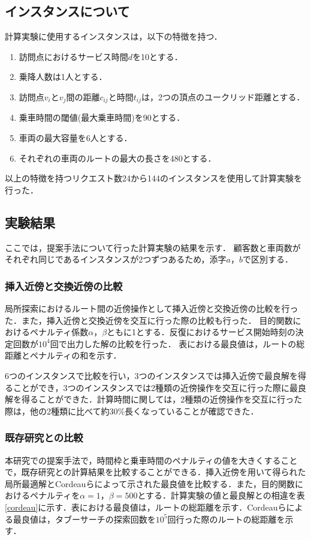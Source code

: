 \documentclass[a4j，11pt，twocolumn]{jsarticle}
\begin{document}
\subsection{インスタンスについて}
計算実験に使用するインスタンスは，以下の特徴を持つ．
\begin{enumerate}
 \item 訪問点におけるサービス時間$d$を10とする．
 \item 乗降人数は1人とする．
 \item 訪問点$v_i$と$v_j$間の距離$c_{ij}$と時間$t_{ij}$は，2つの頂点のユークリッド距離とする．
 \item 乗車時間の閾値(最大乗車時間)を90とする．
 \item 車両の最大容量を6人とする．
 \item それぞれの車両のルートの最大の長さを480とする．
\end{enumerate}
以上の特徴を持つリクエスト数24から144のインスタンスを使用して計算実験を行った．

\subsection{実験結果}
ここでは，提案手法について行った計算実験の結果を示す．
顧客数と車両数がそれぞれ同じであるインスタンスが2つずつあるため，添字$a，b$で区別する．

\subsubsection{挿入近傍と交換近傍の比較}
\label{sec:insert}
局所探索におけるルート間の近傍操作として挿入近傍と交換近傍の比較を行った．また，挿入近傍と交換近傍を交互に行った際の比較も行った．
目的関数におけるペナルティ係数$\alpha$，$\beta$ともに1とする．反復におけるサービス開始時刻の決定回数が$10^4$回で出力した解の比較を行った．
表における最良値は，ルートの総距離とペナルティの和を示す．

6つのインスタンスで比較を行い，3つのインスタンスでは挿入近傍で最良解を得ることができ，3つのインスタンスでは2種類の近傍操作を交互に行った際に最良解を得ることができた．計算時間に関しては，2種類の近傍操作を交互に行った際は，他の2種類に比べて約30\%長くなっていることが確認できた．


\subsubsection{既存研究との比較}
\label{sec:cordeau}
本研究での提案手法で，時間枠と乗車時間のペナルティの値を大きくすることで，既存研究との計算結果を比較することができる．挿入近傍を用いて得られた局所最適解とCordeauらによって示された最良値を比較する．また，目的関数におけるペナルティを$\alpha=1，\beta=500$とする．計算実験の値と最良解との相違を表\ref{cordeau}に示す．表における最良値は，ルートの総距離を示す．Cordeauらによる最良値は，タブーサーチの探索回数を$10^5$回行った際のルートの総距離を示す．
\end{document}
